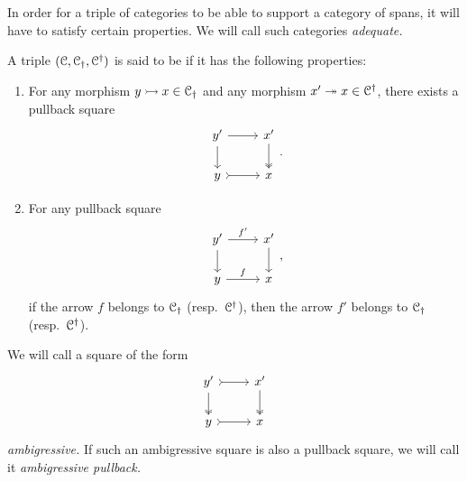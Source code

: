 \documentclass[main.tex]{subfiles}
\begin{document}
In order for a triple of categories to be able to support a category of spans, it will have to satisfy certain properties. We will call such categories \emph{adequate.}

\begin{definition}
  A triple $(\mathcal{C}, \mathcal{C}_{\dagger}, \mathcal{C}^{\dagger})$ is said to be  if it has the following properties:
  \begin{enumerate}
    \item For any morphism $y \rightarrowtail x \in \mathcal{C}_{\dagger}$ and any morphism $x' \twoheadrightarrow x \in \mathcal{C}^{\dagger}$, there exists a pullback square
      \begin{equation*}
        \begin{tikzcd}
          y'
          \arrow[r]
          \arrow[d]
          & x'
          \arrow[d, two heads]
          \\
          y
          \arrow[r, rightarrowtail]
          & x
        \end{tikzcd}.
      \end{equation*}

    \item For any pullback square
      \begin{equation*}
        \begin{tikzcd}
          y'
          \arrow[r, "f'"]
          \arrow[d]
          & x'
          \arrow[d]
          \\
          y
          \arrow[r, "f"]
          & x
        \end{tikzcd},
      \end{equation*}
      if the arrow $f$ belongs to $\mathcal{C}_{\dagger}$ (resp.\ $\mathcal{C}^{\dagger}$), then the arrow $f'$ belongs to $\mathcal{C}_{\dagger}$ (resp.\ $\mathcal{C}^{\dagger}$).
  \end{enumerate}
\end{definition}

We will call a square of the form
\begin{equation*}
  \begin{tikzcd}
    y'
    \arrow[r, rightarrowtail]
    \arrow[d, two heads]
    & x'
    \arrow[d, two heads]
    \\
    y
    \arrow[r, rightarrowtail]
    & x
  \end{tikzcd}
\end{equation*}
\emph{ambigressive.} If such an ambigressive square is also a pullback square, we will call it \emph{ambigressive pullback.}
\end{document}
